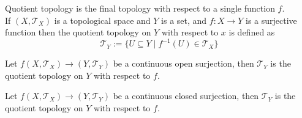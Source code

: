 \vspace{0.4cm}
\begin{remark}[]
    Quotient topology is the final topology with respect to a single function $f$.\\ 
    If $(X,\mathcal{T}_{X})$ is a topological space and $Y$ is a set, and $f:X\to Y$ is a surjective function then the quotient topology on $Y$ with respect to $x$ is defined as $$\mathcal{T}_{Y}:=\{U\subseteq Y\mid f^{-1}(U)\in \mathcal{T}_{X}\}$$
\end{remark}
\vspace{0.4cm}
\begin{theorem}[]
    Let $f(X,\mathcal{T}_{X})\to(Y,\mathcal{T}_{Y})$ be a continuous open surjection, then $\mathcal{T}_{Y}$ is the quotient topology on $Y$ with respect to $f$.
\end{theorem}
\vspace{0.4cm}
\begin{theorem}[]
    Let $f(X,\mathcal{T}_{X})\to(Y,\mathcal{T}_{Y})$ be a continuous closed surjection, then $\mathcal{T}_{Y}$ is the quotient topology on $Y$ with respect to $f$.
\end{theorem}
